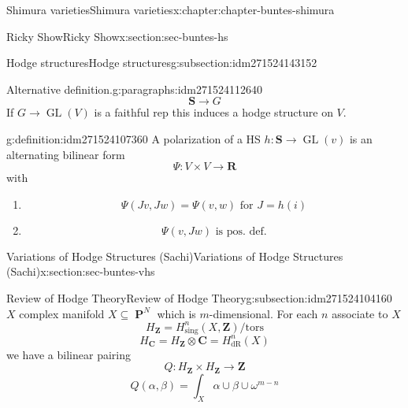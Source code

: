 \documentclass[oneside,10pt,]{book}
\numberwithin{equation}{section}
\newcommand{\ZZ}{\mathbf{Z}}
\newcommand{\RR}{\mathbf{R}}
\newcommand{\CC}{\mathbf{C}}
\newcommand{\dR}{\mathrm{dR}}
\newcommand{\tors}{\mathrm{tors}}
\DeclareMathOperator{\PP}{\mathbf{P}}
\DeclareMathOperator{\GL}{GL}
\begin{document}
\begin{chapterptx}{Shimura varieties}{}{Shimura varieties}{}{}{x:chapter:chapter-buntes-shimura}
\begin{sectionptx}{Ricky Show}{}{Ricky Show}{}{}{x:section:sec-buntes-hs}
\begin{subsectionptx}{Hodge structures}{}{Hodge structures}{}{}{g:subsection:idm271524143152}
\begin{paragraphs}{Alternative definition.}{g:paragraphs:idm271524112640}
\begin{equation*}
\mathbf S \to G
\end{equation*}
If \(G \to \GL(V)\) is a faithful rep this induces a hodge structure on \(V\).%
\begin{definition}{}{g:definition:idm271524107360}%
A polarization of a HS \(h\colon \mathbf S \to \GL(v)\) is an alternating bilinear form%
\begin{equation*}
\Psi \colon V\times V \to \RR
\end{equation*}
with%
\begin{enumerate}
\item{}%
\begin{equation*}
\Psi (Jv,Jw) =  \Psi(v,w) \text{ for } J = h(i)
\end{equation*}
%
\item{}%
\begin{equation*}
\Psi(v,Jw) \text{ is pos. def.}
\end{equation*}
%
\end{enumerate}
%
\end{definition}
\end{paragraphs}%
\end{subsectionptx}
\end{sectionptx}
%
%
\typeout{************************************************}
\typeout{************************************************}
%
\begin{sectionptx}{Variations of Hodge Structures (Sachi)}{}{Variations of Hodge Structures (Sachi)}{}{}{x:section:sec-buntes-vhs}
%
%
\typeout{************************************************}
\typeout{************************************************}
%
\begin{subsectionptx}{Review of Hodge Theory}{}{Review of Hodge Theory}{}{}{g:subsection:idm271524104160}
\(X\) complex manifold \(X\subseteq \PP^N\) which is \(m\)-dimensional. For each \(n\) associate to \(X\)%
\begin{equation*}
H_\ZZ = H^n_{\mathrm{sing}}(X, \ZZ) / \tors
\end{equation*}
%
\begin{equation*}
H_\CC = H_\ZZ \otimes \CC = H^n_\dR(X)
\end{equation*}
we have a bilinear pairing%
\begin{equation*}
Q\colon H_\ZZ \times H_\ZZ \to \ZZ
\end{equation*}
%
\begin{equation*}
Q(\alpha,\beta) = \int_X \alpha \cup \beta \cup \omega^{m-n}

\end{equation*}
\end{subsectionptx}
\end{sectionptx}
\end{chapterptx}
\end{document}
